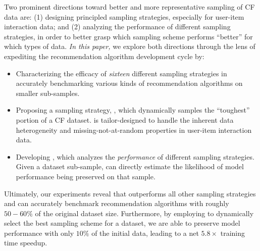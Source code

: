 Two prominent directions toward better and more representative sampling of CF data are: (1) designing principled sampling strategies, especially for user-item interaction data; and (2) analyzing the performance of different sampling strategies, in order to better grasp which sampling scheme performs ``better'' for which types of data. \emph{In this paper,} we explore both directions through the lens of expediting the recommendation algorithm development cycle by:
\begin{itemize}
    \item Characterizing the efficacy of \emph{sixteen} different sampling strategies in accurately benchmarking various kinds of recommendation algorithms on smaller sub-samples.

    \item Proposing a sampling strategy, \sampler, which dynamically samples the ``toughest'' portion of a CF dataset. \sampler is tailor-designed to handle the inherent data heterogeneity and missing-not-at-random properties in user-item interaction data.
    
    \item Developing \oracle, which analyzes the \emph{performance} of different sampling strategies. Given a dataset sub-sample, \oracle can directly estimate the likelihood of model performance being preserved on that sample. 
\end{itemize}
%
Ultimately, our experiments reveal that \sampler outperforms all other sampling strategies and can accurately benchmark recommendation algorithms with roughly $50-60\%$ of the original dataset size. Furthermore, by employing \oracle to dynamically select the best sampling scheme for a dataset, we are able to preserve model performance with only $10\%$ of the initial data, leading to a net $5.8\times$ training time speedup.
